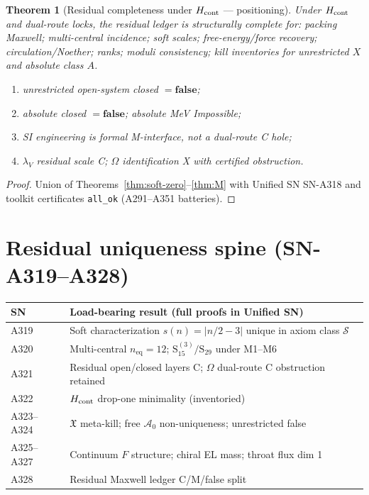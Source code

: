 \documentclass[11pt,a4paper]{article}
\newtheorem{theorem}{Theorem}
\theoremstyle{remark}
\begin{document}
\begin{theorem}[Residual completeness under $H_{\rm cont}$ --- positioning]
\label{thm:positioning}
Under $H_{\rm cont}$ and dual-route locks, the residual ledger is structurally complete for: packing Maxwell; multi-central incidence; soft scales; free-energy/force recovery; circulation/Noether; ranks; moduli consistency; kill inventories for unrestricted $X$ and absolute class $A$.
\begin{enumerate}[label=(\roman*)]
\item unrestricted open-system closed $=\mathbf{false}$;
\item absolute closed $=\mathbf{false}$; absolute MeV Impossible;
\item SI engineering is formal M-interface, not a dual-route C hole;
\item $\lambda_V$ residual scale C; $\Omega$ identification X with certified obstruction.
\end{enumerate}
\end{theorem}

\begin{proof}
Union of Theorems~\ref{thm:soft-zero}--\ref{thm:M} with Unified SN SN-A318 and toolkit certificates \texttt{all\_ok} (A291--A351 batteries).
\end{proof}



\section{Residual uniqueness spine (SN-A319--A328)}
\label{sec:spine-A319-A328}

\begin{center}
\begin{tabular}{@{}p{3.2cm}p{8.2cm}@{}}
\toprule
SN & Load-bearing result (full proofs in Unified SN) \\
\midrule
A319 & Soft characterization $s(n)=|n/2-3|$ unique in axiom class $\mathcal{S}$ \\
A320 & Multi-central $n_{\mathrm{eq}}=12$; $\mathrm{S}_{15}^{(3)}/\mathrm{S}_{29}$ under M1--M6 \\
A321 & Residual open/closed layers C; $\Omega$ dual-route C obstruction retained \\
A322 & $H_{\rm cont}$ drop-one minimality (inventoried) \\
A323--A324 & $\mathfrak{X}$ meta-kill; free $\mathcal{A}_0$ non-uniqueness; unrestricted false \\
A325--A327 & Continuum $F$ structure; chiral EL mass; throat flux dim 1 \\
A328 & Residual Maxwell ledger C/M/false split \\
\bottomrule
\end{tabular}
\end{center}
\end{document}
